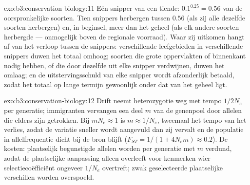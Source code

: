 \begin{solution}{exo:b3:conservation-biology:11}
Eén snipper van een tiende: $0.1^{0.25} = 0.56$ van de oorspronkelijke
soorten. Tien snippers herbergen tussen $0.56$ (als zij alle dezelfde
soorten herbergen) en, in beginsel, meer dan het geheel (als elk andere
soorten herbergde --- onmogelijk boven de regionale voorraad). Waar zij
uitkomen hangt af van het verloop tussen de snippers: verschillende
leefgebieden in verschillende snippers duwen het totaal omhoog; soorten
die grote oppervlakten of binnenkant nodig hebben, of die door dezelfde
 uit elke snipper verdwijnen, duwen het omlaag; en de
uitstervingsschuld van elke snipper wordt afzonderlijk betaald, zodat
het totaal op lange termijn gewoonlijk onder dat van het geheel ligt.
\end{solution}

\begin{solution}{exo:b3:conservation-biology:12}
Drift neemt heterozygotie weg met tempo $1/2N_{e}$ per generatie;
immigranten vervangen een deel $m$ van de genenpoel door allelen die
elders zijn getrokken. Bij $mN_{e} \approx 1$ is $m \approx 1/N_{e}$,
tweemaal het tempo van het verlies, zodat de variatie sneller wordt
aangevuld dan zij vervalt en de populatie in allelfrequentie dicht bij
de bron blijft ($F_{ST} = 1/(1
+ 4N_{e}m) \approx 0.2$). De kosten: plaatselijk begunstigde allelen
worden per generatie met $m$ verdund, zodat de plaatselijke aanpassing
alleen overleeft voor kenmerken wier selectiecoëfficiënt ongeveer
$1/N_{e}$ overtreft; zwak geselecteerde plaatselijke verschillen worden
overspoeld.
\end{solution}

